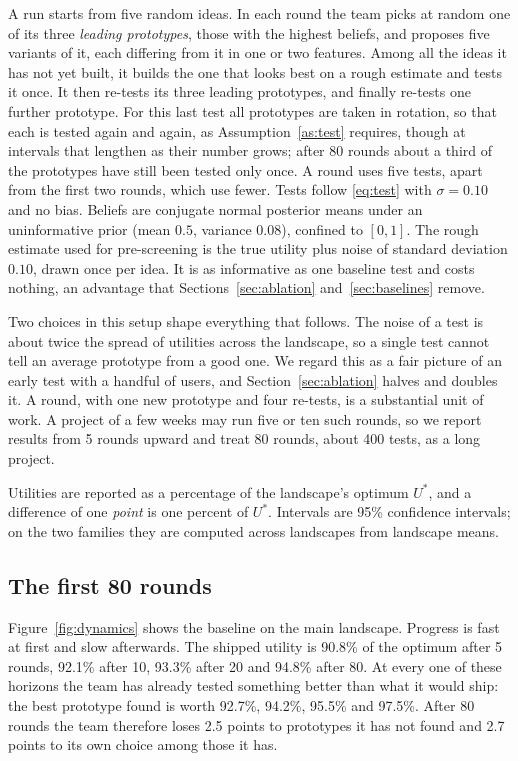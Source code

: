 \documentclass[10pt,twocolumn]{article}
\theoremstyle{definition}
\begin{document}
A run starts from five random ideas. In each round the team picks at random one of its three \emph{leading prototypes}, those with the highest beliefs, and proposes five variants of it, each differing from it in one or two features. Among all the ideas it has not yet built, it builds the one that looks best on a rough estimate and tests it once. It then re-tests its three leading prototypes, and finally re-tests one further prototype. For this last test all prototypes are taken in rotation, so that each is tested again and again, as Assumption~\ref{as:test} requires, though at intervals that lengthen as their number grows; after 80 rounds about a third of the prototypes have still been tested only once. A round uses five tests, apart from the first two rounds, which use fewer. Tests follow \eqref{eq:test} with $\sigma=0.10$ and no bias. Beliefs are conjugate normal posterior means under an uninformative prior (mean $0.5$, variance $0.08$), confined to $[0,1]$. The rough estimate used for pre-screening is the true utility plus noise of standard deviation $0.10$, drawn once per idea. It is as informative as one baseline test and costs nothing, an advantage that Sections~\ref{sec:ablation} and~\ref{sec:baselines} remove.

Two choices in this setup shape everything that follows. The noise of a test is about twice the spread of utilities across the landscape, so a single test cannot tell an average prototype from a good one. We regard this as a fair picture of an early test with a handful of users, and Section~\ref{sec:ablation} halves and doubles it. A round, with one new prototype and four re-tests, is a substantial unit of work. A project of a few weeks may run five or ten such rounds, so we report results from 5 rounds upward and treat 80 rounds, about 400 tests, as a long project.

Utilities are reported as a percentage of the landscape's optimum $U^*$, and a difference of one \emph{point} is one percent of $U^*$. Intervals are 95\% confidence intervals; on the two families they are computed across landscapes from landscape means.

\subsection{The first 80 rounds}
\label{sec:dynamics}

Figure~\ref{fig:dynamics} shows the baseline on the main landscape. Progress is fast at first and slow afterwards. The shipped utility is 90.8\% of the optimum after 5 rounds, 92.1\% after 10, 93.3\% after 20 and 94.8\% after 80. At every one of these horizons the team has already tested something better than what it would ship: the best prototype found is worth 92.7\%, 94.2\%, 95.5\% and 97.5\%. After 80 rounds the team therefore loses 2.5 points to prototypes it has not found and 2.7 points to its own choice among those it has.
\end{document}

